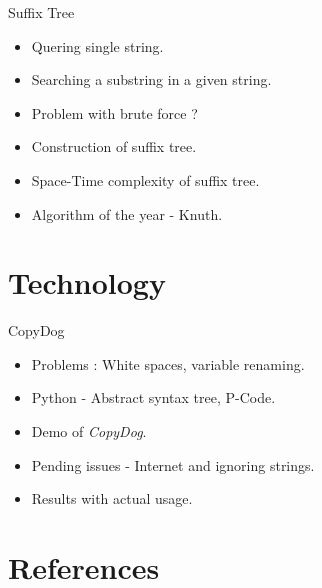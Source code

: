 \documentclass[color=usenames,dvipsnames]{beamer}
\begin{document}
\begin{frame}{Suffix Tree}

\begin{itemize}
  \setlength{\itemsep}{25pt}
  
  \item Quering single string.
  
  \item Searching a substring in a given string.
  
  \item Problem with brute force ?
  
  \item Construction of suffix tree.
  
  \item Space-Time complexity of suffix tree.
  
  \item Algorithm of the year - Knuth.

  
\end{itemize}

\end{frame}

 \section{Technology}

\begin{frame}{CopyDog}

\begin{itemize}
  \setlength{\itemsep}{30pt}
  
  \item Problems : White spaces, variable renaming. 
  
  \item Python - Abstract syntax tree, P-Code.
  
  \item Demo of \emph{CopyDog}.
  
  \item Pending issues - Internet and ignoring strings.
   
  \item Results with actual usage.
  
\end{itemize}

\end{frame}


\section{References}
\end{document}
